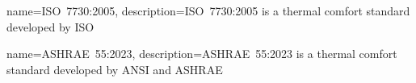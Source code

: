 \usepackage[nonumberlist,nogroupskip]{glossaries}


{
name={ISO~7730:2005},
description={ISO~7730:2005 is a thermal comfort standard developed by ISO}
}

{
name={ASHRAE~55:2023},
description={ASHRAE~55:2023 is a thermal comfort standard developed by ANSI and ASHRAE}
}

